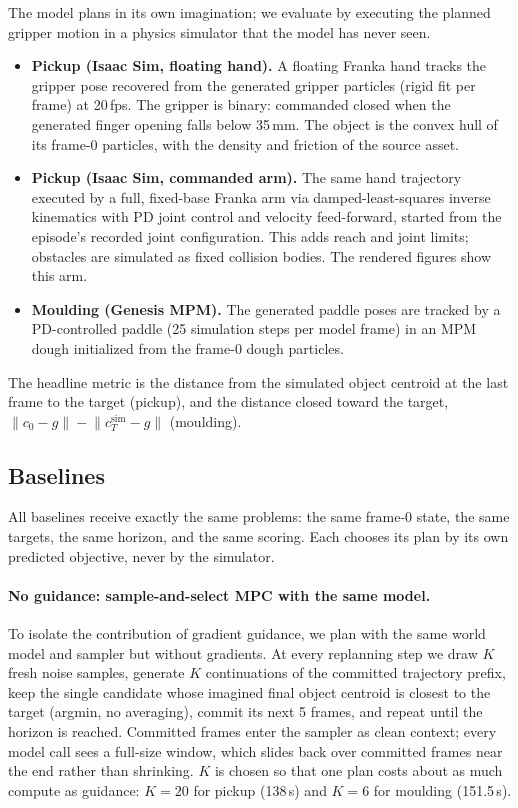 The model plans in its own imagination; we evaluate by executing the planned gripper motion in a physics simulator
that the model has never seen.
\begin{itemize}
  \item \textbf{Pickup (Isaac Sim, floating hand).} A floating Franka hand tracks the gripper pose recovered from the
        generated gripper particles (rigid fit per frame) at 20\,fps. The gripper is binary: commanded closed when the
        generated finger opening falls below 35\,mm. The object is the convex hull of its frame-0 particles, with the
        density and friction of the source asset.
  \item \textbf{Pickup (Isaac Sim, commanded arm).} The same hand trajectory executed by a full, fixed-base Franka arm
        via damped-least-squares inverse kinematics with PD joint control and velocity feed-forward, started from the
        episode's recorded joint configuration. This adds reach and joint limits; obstacles are simulated as fixed
        collision bodies. The rendered figures show this arm.
  \item \textbf{Moulding (Genesis MPM).} The generated paddle poses are tracked by a PD-controlled paddle
        (25 simulation steps per model frame) in an MPM dough initialized from the frame-0 dough particles.
\end{itemize}
The headline metric is the distance from the simulated object centroid at the last frame to the target
(pickup), and the distance closed toward the target, $\lVert c_0 - g\rVert - \lVert c^{\text{sim}}_T - g\rVert$ (moulding).

\subsection{Baselines}
\label{sec:baselines}

All baselines receive exactly the same problems: the same frame-0 state, the same targets, the same horizon, and the
same scoring. Each chooses its plan by its own predicted objective, never by the simulator.

\paragraph{No guidance: sample-and-select MPC with the same model.}
To isolate the contribution of gradient guidance, we plan with the same world model and sampler but without
gradients. At every replanning step we draw $K$ fresh noise samples, generate $K$ continuations of the committed
trajectory prefix, keep the single candidate whose imagined final object centroid is closest to the target
(argmin, no averaging), commit its next 5 frames, and repeat until the horizon is reached. Committed frames enter the
sampler as clean context; every model call sees a full-size window, which slides back over committed frames near the
end rather than shrinking. $K$ is chosen so that one plan costs about as much compute as guidance:
$K = 20$ for pickup (138\,s) and $K = 6$ for moulding (151.5\,s).

